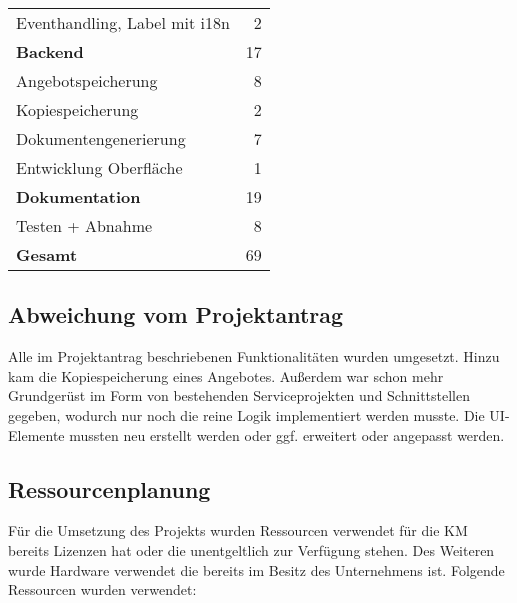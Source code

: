 {\begin{tabular}{|l|r|}
	Eventhandling, Label mit i18n                            &                        2 \\
	\textbf{Backend  }                                       &                       17 \\
	Angebotspeicherung                                       &                        8 \\
	Kopiespeicherung                                         &                        2 \\
	Dokumentengenerierung                                    &                        7 \\
	Entwicklung Oberfläche                                   &                        1 \\
	\textbf{Dokumentation }                                  &                       19 \\
	Testen + Abnahme                                         &                        8 \\ \hline
	\textbf{	Gesamt    }                                  &                       69 \\ \hline
\end{tabular}


\subsection{Abweichung vom Projektantrag}
\label{abweichung}
Alle im Projektantrag beschriebenen Funktionalitäten wurden umgesetzt. Hinzu kam die Kopiespeicherung eines Angebotes. Außerdem war schon mehr Grundgerüst im Form von bestehenden Serviceprojekten und Schnittstellen gegeben, wodurch nur noch die reine Logik implementiert werden musste. Die UI-Elemente mussten neu erstellt werden oder ggf. erweitert oder angepasst werden.
\subsection{Ressourcenplanung}
\label{ressourcenplanung}
Für die Umsetzung des Projekts wurden Ressourcen verwendet für die \ac{KM} bereits Lizenzen hat oder die unentgeltlich zur Verfügung stehen. Des Weiteren wurde Hardware verwendet die bereits im Besitz des Unternehmens ist.
Folgende Ressourcen wurden verwendet:

}
